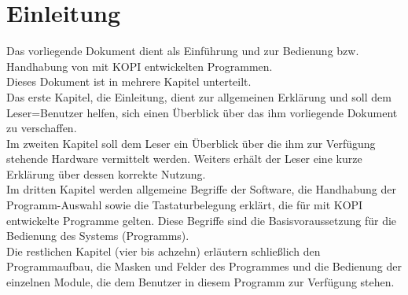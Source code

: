 
\chapter{Einleitung}

Das vorliegende Dokument dient als Einf\"{u}hrung und zur Bedienung bzw.
Handhabung von mit KOPI entwickelten Programmen.\\

Dieses Dokument ist in mehrere Kapitel unterteilt.\\

Das erste Kapitel, die Einleitung, dient zur allgemeinen Erkl\"{a}rung und soll
dem Leser=Benutzer helfen, sich einen \"{U}berblick \"{u}ber das ihm
vorliegende Dokument zu verschaffen. \\

Im zweiten Kapitel soll dem Leser ein \"{U}berblick
\"{u}ber die ihm zur Verf\"{u}gung stehende Hardware vermittelt werden. Weiters
erh\"{a}lt der Leser eine kurze Erkl\"{a}rung \"{u}ber dessen korrekte Nutzung.\\

Im dritten Kapitel werden  allgemeine Begriffe der Software, die Handhabung der
Programm-Auswahl sowie die Tastaturbelegung erkl\"{a}rt, die f\"{u}r mit KOPI entwickelte Programme gelten. Diese Begriffe sind die Basisvoraussetzung f\"{u}r die
Bedienung des Systems (Programms).\\

Die restlichen Kapitel (vier bis achzehn) erl\"{a}utern schlie{\ss}lich den
Programmaufbau, die Masken und Felder des Programmes und die Bedienung der
einzelnen Module, die dem Benutzer in diesem Programm zur Verf\"{u}gung stehen.\\

